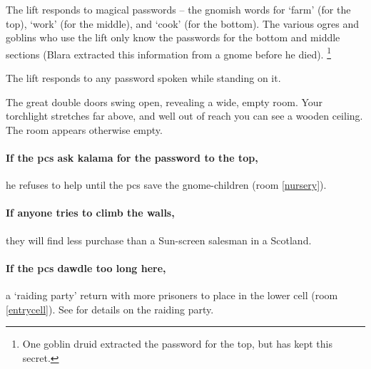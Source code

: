 \begin{multicols}{2}
The lift responds to magical passwords -- the gnomish words for `farm' (for the top), `work' (for the middle), and `cook' (for the bottom).
The various ogres and goblins who use the lift only know the passwords for the bottom and middle sections (Blara extracted this information from a gnome before he died).%
\footnote{One goblin druid extracted the password for the top, but has kept this secret.}

The lift responds to any password spoken while standing on it.

\begin{boxtext}
  The great double doors swing open, revealing a wide, empty room.
  Your torchlight stretches far above, and well out of reach you can see a wooden ceiling.
  The room appears otherwise empty.
\end{boxtext}

\paragraph{If the \glspl{pc} ask \gls{kalama} for the password to the top,}
he refuses to help until the \glspl{pc} save the gnome-children (room \vref{nursery}).

\paragraph{If anyone tries to climb the walls,}
they will find less purchase than a Sun-screen salesman in a Scotland.

\paragraph{If the \glspl{pc} dawdle too long here,}
a `raiding party' return with more prisoners to place in the lower cell (room \ref{entrycell}).
See  for details on the raiding party.



\end{multicols}
